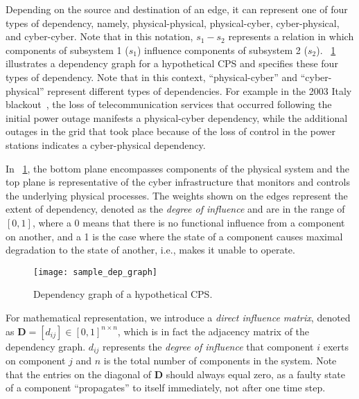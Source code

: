 \documentclass[12pt]{elsarticle}
\begin{document}
Depending on the source and destination of an edge, it can represent one of four types of dependency, namely, physical-physical, physical-cyber, cyber-physical, and cyber-cyber. Note that in this notation, $s_1-s_2$ represents a relation in which components of subsystem 1 ($s_1$) influence components of subsystem 2 ($s_2$). \figurename~\ref{fig:sample_dep_graph} illustrates a dependency graph for a hypothetical CPS and specifies these four types of dependency. Note that in this context, ``physical-cyber'' and ``cyber-physical'' represent different types of dependencies. For example in the 2003 Italy blackout~\cite{BeA04}, the loss of telecommunication services that occurred following the initial power outage manifests a physical-cyber dependency, while the additional outages in the grid that took place because of the loss of control in the power stations indicates a cyber-physical dependency.

In \figurename~\ref{fig:sample_dep_graph}, the bottom plane encompasses components of the physical system and the top plane is representative of the cyber infrastructure that monitors and controls the underlying physical processes. The weights shown on the edges represent the extent of dependency, denoted as the \emph{degree of influence} and are in the range of $[0, 1]$, where a 0 means that there is no functional influence from a component on another, and a 1 is the case where the state of a component causes maximal degradation to the state of another, i.e., makes it unable to operate.

\begin{figure}
\centering
\texttt{[image: sample\_dep\_graph]}
\caption{Dependency graph of a hypothetical CPS.}
\label{fig:sample_dep_graph}
\end{figure}

For mathematical representation, we introduce a \emph{direct influence matrix}, denoted as $\mathbf{D} = \left[d_{ij}\right] \in [0, 1]^{n \times n}$, which is in fact the adjacency matrix of the dependency graph. $d_{ij}$ represents the \emph{degree of influence} that component $i$ exerts on component $j$ and $n$ is the total number of components in the system. Note that the entries on the diagonal of $\mathbf{D}$ should always equal zero, as a faulty state of a component ``propagates'' to itself immediately, not after one time step.
\end{document}
